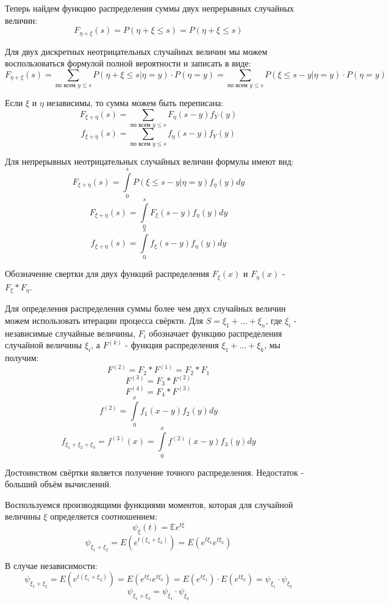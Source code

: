 \documentclass[%
12pt, %
final, %
oneside, %
onecolumn, %
centertags]{article} %
\theoremstyle{plain}
\theoremstyle{definition}
\theoremstyle{remark}
\begin{document}
Теперь найдем функцию распределения суммы двух непрерывных случайных величин:
$$F_{\eta + \xi} (s)= P(\eta + \xi \leqslant s) = P(\eta + \xi \leqslant s)$$

Для двух дискретных неотрицательных случайных величин мы можем воспользоваться формулой полной вероятности и записать в виде:
$$F_{\eta + \xi}(s) = \sum\limits_{\text{по всем } y \leqslant s} P(\eta + \xi \leqslant s \vert \eta = y)  \cdot P(\eta = y) = \sum\limits_{\text{по всем } y \leqslant s} P(\xi \leqslant s - y \vert \eta = y) \cdot P(\eta = y)$$

Если $\xi$ и $\eta$ независимы, то сумма можем быть переписана:
$$F_{\xi + \eta}(s) =  \sum\limits_{\text{по всем } y \leqslant s} F_{\eta}(s-y)f_{Y}(y)$$
$$f_{\xi + \eta}(s) =  \sum\limits_{\text{по всем } y \leqslant s} f_{\eta}(s-y)f_{Y}(y)$$

Для непрерывных неотрицательных случайных величин формулы имеют вид:
$$F_{\xi + \eta}(s) = \int\limits_0^s P(\xi \leqslant s-y \vert \eta = y)f_{\eta}(y)dy$$
$$F_{\xi + \eta}(s) = \int\limits_0^s F_{\xi}(s-y)f_{\eta}(y)dy$$
$$f_{\xi + \eta}(s) = \int\limits_0^s f_{\xi}(s-y)f_{\eta}(y)dy$$

Обозначение свертки для двух функций распределения $F_{\xi}(x)$ и $F_{\eta}(x)$ - $F_{\xi} * F_{\eta}$.

Для определения распределения суммы более чем двух случайных величин можем использовать итерации процесса свёркти. Для $S = \xi_1 + \ldots + \xi_n$, где $\xi_i$ - независимые случайные величины, $F_i$ обозначает функцию распределения случайной величины $\xi_i$, а $F^{(k)}$ - функция распределения $\xi_1 + \ldots + \xi_k$, мы получим:
$$F^{(2)} = F_2 * F^{(1)} = F_2 * F_1$$
$$F^{(3)} = F_3 * F^{(2)}$$
$$F^{(4)} = F_4 * F^{(3)}$$
$$f^{(2)} = \int\limits_0^x f_1(x-y)f_2(y)dy$$
$$f_{\xi_1 + \xi_2 + \xi_3} = f^{(3)}(x) = \int\limits_0^x f^{(2)}(x-y)f_3(y)dy$$

Достоинством свёртки является получение точного распределения. Недостаток - больший объём вычислений.

Воспользуемся производящими функциями моментов, которая для случайной величины $\xi$ определяется соотношением:
$$\psi_{\xi}(t) = \mathbb{E}e^{t\xi}$$
$$\psi_{\xi_1 + \xi_2} = E\left(e^{t(\xi_1 + \xi_2)}\right) = E\left(e^{t\xi_1}e^{t\xi_2}\right)$$

В случае независимости:
$$\psi_{\xi_1 + \xi_2} = E\left(e^{t(\xi_1 + \xi_2)}\right) = E\left(e^{t\xi_1}e^{t\xi_2}\right) = E(e^{t\xi_1}) \cdot E(e^{t\xi_2}) = \psi_{\xi_1} \cdot \psi_{\xi_2} $$
$$\psi_{\xi_1 + \xi_2} =  \psi_{\xi_1} \cdot \psi_{\xi_2}$$
\end{document}

